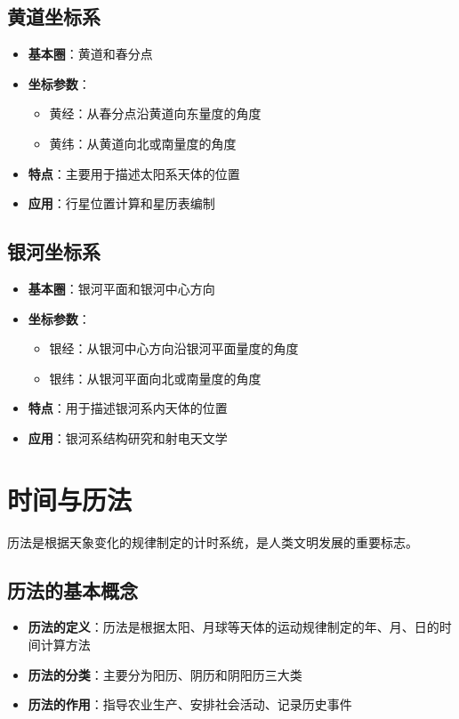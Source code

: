 \documentclass[12pt,UTF8]{ctexbook}
\begin{document}
\subsection{黄道坐标系}

\begin{itemize}
  \item \textbf{基本圈}：黄道和春分点
  \item \textbf{坐标参数}：
    \begin{itemize}
      \item 黄经：从春分点沿黄道向东量度的角度
      \item 黄纬：从黄道向北或南量度的角度
    \end{itemize}
  \item \textbf{特点}：主要用于描述太阳系天体的位置
  \item \textbf{应用}：行星位置计算和星历表编制
\end{itemize}

\subsection{银河坐标系}

\begin{itemize}
  \item \textbf{基本圈}：银河平面和银河中心方向
  \item \textbf{坐标参数}：
    \begin{itemize}
      \item 银经：从银河中心方向沿银河平面量度的角度
      \item 银纬：从银河平面向北或南量度的角度
    \end{itemize}
  \item \textbf{特点}：用于描述银河系内天体的位置
  \item \textbf{应用}：银河系结构研究和射电天文学
\end{itemize}
\section{时间与历法}

历法是根据天象变化的规律制定的计时系统，是人类文明发展的重要标志。

\subsection{历法的基本概念}

\begin{itemize}
  \item \textbf{历法的定义}：历法是根据太阳、月球等天体的运动规律制定的年、月、日的时间计算方法
  \item \textbf{历法的分类}：主要分为阳历、阴历和阴阳历三大类
  \item \textbf{历法的作用}：指导农业生产、安排社会活动、记录历史事件
\end{itemize}
\end{document}

